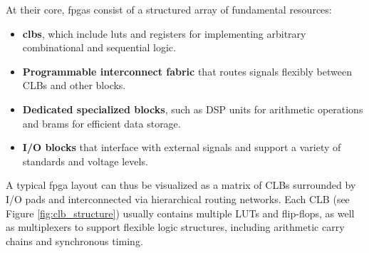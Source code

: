 At their core, \Glspl{fpga} consist of a structured array of fundamental resources:
\begin{itemize}
  \item \textbf{\Glspl{clb}}, which include \glspl{lut} and registers for implementing arbitrary combinational and sequential logic.
  \item \textbf{Programmable interconnect fabric} that routes signals flexibly between CLBs and other blocks.
  \item \textbf{Dedicated specialized blocks}, such as DSP units for arithmetic operations and \glspl{bram} for efficient data storage.
  \item \textbf{I/O blocks} that interface with external signals and support a variety of standards and voltage levels.
\end{itemize}

A typical \Gls{fpga} layout can thus be visualized as a matrix of CLBs  surrounded by I/O pads and interconnected via hierarchical routing networks. Each CLB (see Figure \ref{fig:clb_structure}) usually contains multiple LUTs and flip-flops, as well as multiplexers to support flexible logic structures, including arithmetic carry chains and synchronous timing.

